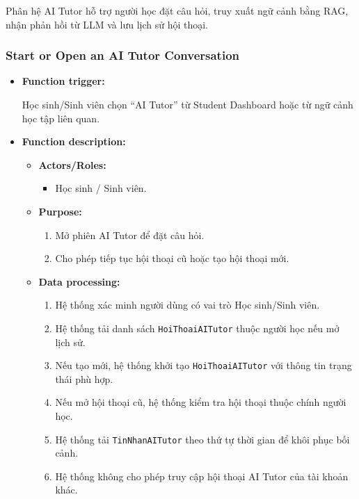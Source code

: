 \documentclass[12pt,a4paper,oneside]{report}
\begin{document}
Phân hệ AI Tutor hỗ trợ người học đặt câu hỏi, truy xuất ngữ cảnh bằng RAG, nhận phản hồi từ LLM và lưu lịch sử hội thoại.

\subsubsection{Start or Open an AI Tutor Conversation}
\label{subsubsec:start-ai-tutor-conversation}

\begin{itemize}

    \item \textbf{Function trigger:}

    Học sinh/Sinh viên chọn ``AI Tutor'' từ Student Dashboard hoặc từ ngữ cảnh học tập liên quan.

    \item \textbf{Function description:}

    \begin{itemize}

        \item \textbf{Actors/Roles:}
        \begin{itemize}
            \item Học sinh / Sinh viên.
        \end{itemize}

        \item \textbf{Purpose:}
        \begin{enumerate}
            \item Mở phiên AI Tutor để đặt câu hỏi.
            \item Cho phép tiếp tục hội thoại cũ hoặc tạo hội thoại mới.
        \end{enumerate}

        \item \textbf{Data processing:}
        \begin{enumerate}
            \item Hệ thống xác minh người dùng có vai trò Học sinh/Sinh viên.
            \item Hệ thống tải danh sách \texttt{HoiThoaiAITutor} thuộc người học nếu mở lịch sử.
            \item Nếu tạo mới, hệ thống khởi tạo \texttt{HoiThoaiAITutor} với thông tin trạng thái phù hợp.
            \item Nếu mở hội thoại cũ, hệ thống kiểm tra hội thoại thuộc chính người học.
            \item Hệ thống tải \texttt{TinNhanAITutor} theo thứ tự thời gian để khôi phục bối cảnh.
            \item Hệ thống không cho phép truy cập hội thoại AI Tutor của tài khoản khác.
        \end{enumerate}


\end{itemize}
\end{itemize}
\end{document}
